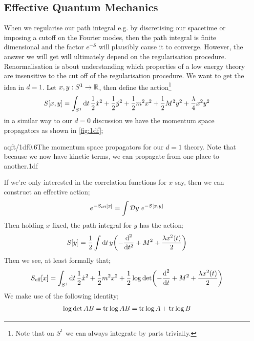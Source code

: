 \subsection{Effective Quantum Mechanics}
When we regularise our path integral e.g. by discretising our spacetime or imposing a cutoff on the Fourier modes, then the path integral is finite dimensional and the factor $e^{-S}$ will plausibly cause it to converge. However, the answer we will get will ultimately depend on the regularisation procedure. Renormalisation is about understanding which properties of a low energy theory are insensitive to the cut off of the regularisation procedure. We want to get the idea in $d = 1$. Let $x, y : S^{1} \rightarrow \mathbb{R}$, then define the action\footnote{Note that on $S^{1}$ we can always integrate by parts trivially.}
\begin{equation*}
S[x, y] = \int_{S^1}{\text{d}t \,\frac{1}{2}\dot{x}^2 + \frac{1}{2}\dot{y}^2 + \frac{1}{2}m^2 x^2 + \frac{1}{2}M^2 y^2 + \frac{\lambda}{4}x^2 y^2}
\end{equation*}
in a similar way to our $d = 0$ discussion we have the momentum space propagators as shown in \autoref{fig:1df};
\begin{mygraphic}{aqft/1df}{0.6}{The momentum space propagators for our $d = 1$ theory. Note that because we now have kinetic terms, we can propagate from one place to another.}{1df}\end{mygraphic}
If we're only interested in the correlation functions for $x$ say, then we can construct an effective action;
\begin{equation*}
e^{-S_{\text{eff}}[x]} = \int{\mathcal{D}y \,\, e^{-S[x, y]}}
\end{equation*}
Then holding $x$ fixed, the path integral for $y$ has the action;
\begin{equation*}
S[y] = \frac{1}{2}\int{\upd{t}y\left(-\frac{\ud^2}{\ud t^2} + M^2 + \frac{\lambda x^2(t)}{2}\right)}
\end{equation*}
Then we see, at least formally that;
\begin{multline}
S_{\text{eff}}[x] = \int_{S^1}{\upd{t}\frac{1}{2}\dot{x}^2 + \frac{1}{2}m^2 x^2} + \frac{1}{2}\log \det \left(-\frac{\ud^2}{\ud t} + M^2 + \frac{\lambda x^2(t)}{2}\right)
\end{multline}
We make use of the following identity;
\begin{equation*}
\log \det AB = \tr \log AB = \tr \log A + \tr \log B
\end{equation*}
